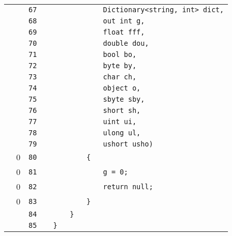 \documentclass[a4paper,landscape,10pt]{article}
\begin{document}
\begin{longtable}[l]{lrrll}
\cellcolor{gray} &  & \verb~67~ & & \verb~            Dictionary<string, int> dict,~\\
\cellcolor{gray} &  & \verb~68~ & & \verb~            out int g,~\\
\cellcolor{gray} &  & \verb~69~ & & \verb~            float fff,~\\
\cellcolor{gray} &  & \verb~70~ & & \verb~            double dou,~\\
\cellcolor{gray} &  & \verb~71~ & & \verb~            bool bo,~\\
\cellcolor{gray} &  & \verb~72~ & & \verb~            byte by,~\\
\cellcolor{gray} &  & \verb~73~ & & \verb~            char ch,~\\
\cellcolor{gray} &  & \verb~74~ & & \verb~            object o,~\\
\cellcolor{gray} &  & \verb~75~ & & \verb~            sbyte sby,~\\
\cellcolor{gray} &  & \verb~76~ & & \verb~            short sh,~\\
\cellcolor{gray} &  & \verb~77~ & & \verb~            uint ui,~\\
\cellcolor{gray} &  & \verb~78~ & & \verb~            ulong ul,~\\
\cellcolor{gray} &  & \verb~79~ & & \verb~            ushort usho)~\\
\cellcolor{red} & 0 & \verb~80~ & & \verb~        {~\\
\cellcolor{red} & 0 & \verb~81~ & & \verb~            g = 0;~\\
\cellcolor{red} & 0 & \verb~82~ & & \verb~            return null;~\\
\cellcolor{red} & 0 & \verb~83~ & & \verb~        }~\\
\cellcolor{gray} &  & \verb~84~ & & \verb~    }~\\
\cellcolor{gray} &  & \verb~85~ & & \verb~}~\\
\end{longtable}
\end{document}
